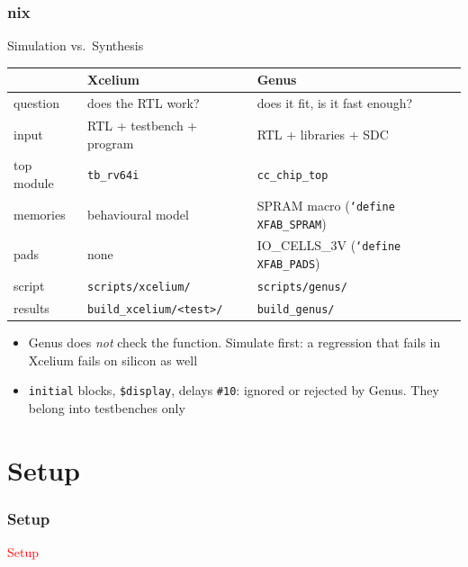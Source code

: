 \documentclass{beamer}
\newcommand{\astitle}{nix}
\newcommand{\assubtitle}{nix}
\newcommand{\cmd}[1]{\texttt{#1}}
\begin{document}
\renewcommand{\assubtitle}{Simulation vs.\ Synthesis}
\begin{frame}
\frametitle{\astitle}
\begin{block}{\assubtitle}
  \footnotesize
  \begin{tabularx}{\linewidth}{@{}lYY@{}}
                     & \textbf{Xcelium}               & \textbf{Genus}\\\hline
    question         & does the RTL work?             & does it fit, is it fast enough?\\
    input            & RTL + testbench + program      & RTL + libraries + SDC\\
    top module       & \cmd{tb\_rv64i}                & \cmd{cc\_chip\_top}\\
    memories         & behavioural model              & SPRAM macro (\cmd{`define XFAB\_SPRAM})\\
    pads             & none                           & IO\_CELLS\_3V (\cmd{`define XFAB\_PADS})\\
    script           & \cmd{scripts/xcelium/}         & \cmd{scripts/genus/}\\
    results          & \cmd{build\_xcelium/<test>/}   & \cmd{build\_genus/}\\
  \end{tabularx}
  \vspace{4pt}
  \begin{itemize}
    \item Genus does \emph{not} check the function. Simulate first:
      a regression that fails in Xcelium fails on silicon as well
    \item \cmd{initial} blocks, \cmd{\$display}, delays \cmd{\#10}:
      ignored or rejected by Genus. They belong into testbenches only
  \end{itemize}
\end{block}
\end{frame}

\section{Setup}
\renewcommand{\astitle}{Setup}
\begin{frame}
\frametitle{\astitle}
\textcolor{red}{Setup}
\end{frame}
\end{document}
